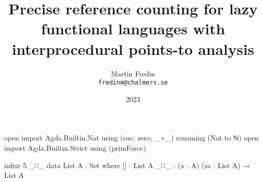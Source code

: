 \documentclass[9pt, twocolumn]{article}
\title{Precise reference counting for lazy functional languages with interprocedural points-to analysis}
\author{Martin Fredin \\ \texttt{fredinm@chalmers.se}}
\date{2023}
\begin{document}
\maketitle

\begin{code}[hide]
open import Agda.Builtin.Nat using (suc; zero; _+_) renaming (Nat to ℕ) 
open import Agda.Builtin.Strict using (primForce)

infixr 5 _∷_
data List A : Set where
  []  : List A
  _∷_ : (x : A) (xs : List A) → List A
\end{code}


%
%
%
%
\end{document}
